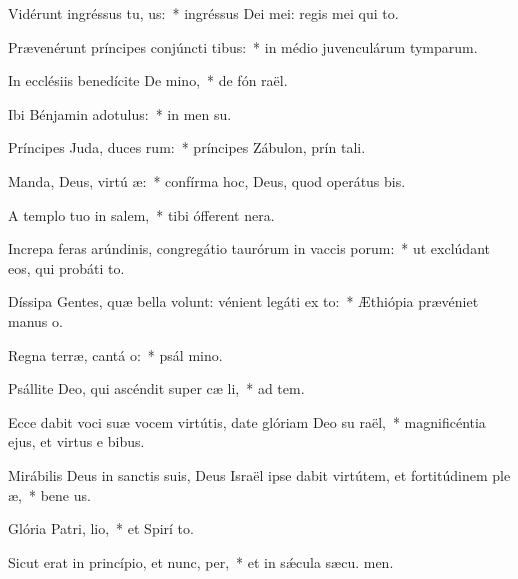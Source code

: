 \item Vidérunt ingréssus tu, us:~* ingréssus Dei mei: regis mei qui   to.
\item Prævenérunt príncipes conjúncti tibus:~* in médio juvenculárum tymparum.
\item In ecclésiis benedícite De mino,~* de fón raël.
\item Ibi Bénjamin adotulus:~* in men su.
\item Príncipes Juda, duces rum:~* príncipes Zábulon, prín tali.
\item Manda, Deus, virtú æ:~* confírma hoc, Deus, quod operátus   bis.
\item A templo tuo in salem,~* tibi ófferent  nera.
\item Increpa feras arúndinis, congregátio taurórum in vaccis porum:~* ut exclúdant eos, qui probáti  to.
\item Díssipa Gentes, quæ bella volunt: vénient legáti ex to:~* Æthiópia prævéniet manus  o.
\item Regna terræ, cantá o:~* psál mino.
\item Psállite Deo, qui ascéndit super cæ li,~* ad tem.
\item Ecce dabit voci suæ vocem virtútis, date glóriam Deo su raël,~* magnificéntia ejus, et virtus e  bibus.
\item Mirábilis Deus in sanctis suis, Deus Israël ipse dabit virtútem, et fortitúdinem ple æ,~* bene us.
\item Glória Patri,  lio,~* et Spirí to.
\item Sicut erat in princípio, et nunc,  per,~* et in sǽcula sæcu. men.
